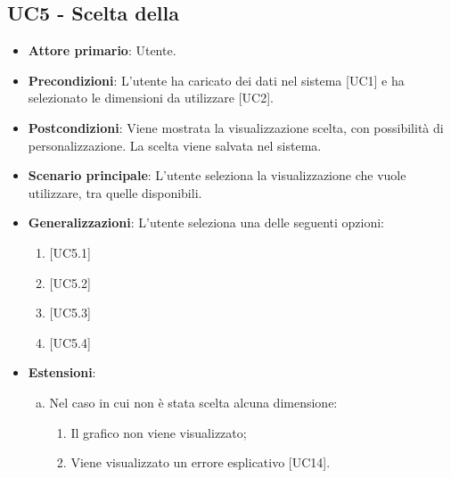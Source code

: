 \subsection{UC5 - Scelta della }
\begin{itemize}
	\item \textbf{Attore primario}: Utente.
	\item \textbf{Precondizioni}: L'utente ha caricato dei dati nel sistema [UC1] e ha selezionato le dimensioni da utilizzare [UC2].
	\item \textbf{Postcondizioni}: Viene mostrata la visualizzazione scelta, con possibilità di personalizzazione. La scelta viene salvata nel sistema.
	\item \textbf{Scenario principale}: L'utente seleziona la visualizzazione che vuole utilizzare, tra quelle disponibili.
	\item \textbf{Generalizzazioni}: L'utente seleziona una delle seguenti opzioni:
		\begin{enumerate}
			\item {}
			\item {}
			\item {}
			\item {}
		\end{enumerate}

	\item \textbf{Estensioni}:
	\begin{enumerate}[(a)]
		\item Nel caso in cui non è stata scelta alcuna dimensione:
		\begin{enumerate}[1.]
			\item Il grafico non viene visualizzato;
			\item Viene visualizzato un errore esplicativo [UC14].
		\end{enumerate}
	\end{enumerate}
\end{itemize}